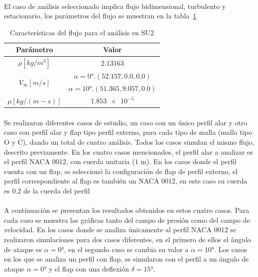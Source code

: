 \documentclass[letterpaper, openright, 12pt]{book}
\begin{document}
    \paragraph*{}
    El caso de análisis seleccionado implica flujo bidimensional, turbulento y
    estacionario, los parámetros del flujo se muestran en la
    tabla~\ref{SU2_simulation}
    \begin{table}[htbp!]
    \begin{center}
        \begin{tabular}{| c | c |}
        \hline
        Parámetro & Valor\\
        \hline
        $\rho[kg / m^3]$ &  $2.13163$\\
        \hline
        \multirow{2}{*}{$V_{\infty}[m / s]$} & $\alpha = \ang{0}.
        (52.157, 0.0, 0.0)$\\
        & $\alpha = \ang{10}. (51.365, 9.057, 0.0)$\\
        \hline
        $\mu[kg / (m-s)]$ &  $\num{1.853e-5}$\\
        \hline
        \end{tabular}
        \caption{Características del flujo para el análisis en SU2}
        \label{SU2_simulation}
    \end{center}
    \end{table}

    \paragraph*{}
    Se realizaron diferentes casos de estudio, un caso con un único perfil alar
    y otro caso con perfil alar y flap tipo perfil externo, para cada tipo de
    malla (malla tipo O y C), dando un total de cuatro análisis. Todos los
    casos simulan el mismo flujo, descrito previamente. En los cuatro casos
    mencionados, el perfil alar a analizar es el perfil NACA 0012, con cuerda
    unitaria ($1$ m). En los casos donde el perfil cuenta con un flap, se
    seleccionó la configuración de flap de perfil externo, el perfil
    correspondiente al flap es también un NACA 0012, en este caso su cuerda es
    $0.2$ de la cuerda del perfil

    \paragraph*{}
    A continuación se presentan los resultados obtenidos en estos cuatro casos.
    Para cada caso se muestra las gráficas tanto del campo de presión como del
    campo de velocidad. En los casos donde se analiza únicamente al perfil NACA
    0012 se realizaron simulaciones para dos casos diferentes, en el primero de
    ellos el ángulo de ataque es $\alpha = 0\si{\degree}$, en el segundo caso
    se cambia su valor a $\alpha = 10\si{\degree}$. Los casos en los que se
    analiza un perfil con flap, se simularon con el perfil a un ángulo de
    ataque $\alpha = 0 \si{\degree}$ y el flap con una deflexión $\delta = 15
    \si{\degree}$.
\end{document}
